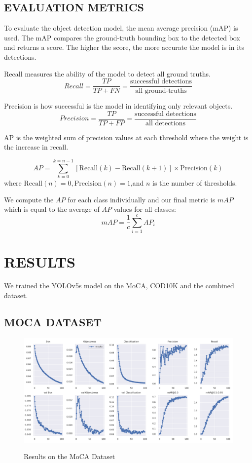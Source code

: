 \documentclass[conference]{IEEEtran}
\begin{document}
\subsection{EVALUATION METRICS}
To evaluate the object detection model, the mean average precision (mAP) is used. The mAP compares the ground-truth bounding box to the detected box and returns a score. The higher the score, the more accurate the model is in its detections.

Recall measures the ability of the model to detect all ground truths. 
$$ Recall = \frac{TP}{TP+FN} = \frac{\text{successful detections}}{\text{all ground-truths}}$$

Precision is how successful is the model in identifying only relevant objects.
$$ Precision = \frac{TP}{TP+FP} = \frac{\text{successful detections}}{\text{all detections}}$$


AP is the weighted sum of precision values at each threshold where the weight is the increase in recall.

$$ AP = \sum_{k=0}^{k=n-1} [\text{Recall}(k) - \text{Recall}(k+1)] \times \text{Precision} (k) $$
where $\text{Recall}(n)=0, \text{Precision}(n)=1$,and $n$ is the number of thresholds.

We compute the $AP$ for each class individually and our final metric is $mAP$ which is equal to the average of $AP$ values for all classes:
$$ mAP = \frac{1}{c} \sum_{i=1}^{c} AP_{i} $$

\newpage
\section {RESULTS}
We trained the YOLOv5s model on the MoCA, COD10K and the combined dataset.

\subsection{MOCA DATASET}

\begin{figure}[h]
    \centering
    \includegraphics[width=0.9\linewidth]{Experiments/MoCA/results.png}\\
    \caption{Results on the MoCA Dataset}
    \label{fig8}
\end{figure}
\end{document}

